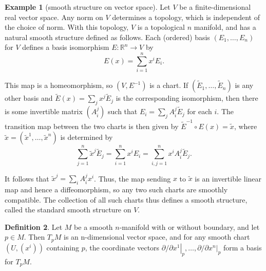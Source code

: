 \documentclass[12pt,a4paper]{book}
\theoremstyle{definition}
\newtheorem{defn}{Definition}[section]
\newtheorem{exam}[defn]{Example}
\begin{document}
\begin{exam}[smooth structure on vector space]
    Let $V$ be a finite-dimensional real vector
    space. Any norm on $V$ determines a topology,
    which is independent of the choice of norm. With this topology, $V$ is a topological $n$ manifold, and has a natural smooth structure defined as follows. Each (ordered) basis $\left(E_1, \ldots, E_n\right)$ for $V$ defines a basis isomorphism $E: \mathbb{R}^n \rightarrow V$ by
    $$
        E(x)=\sum_{i=1}^n x^i E_i .
    $$

    This map is a homeomorphism, so $\left(V, E^{-1}\right)$ is a chart. If $\left(\widetilde{E}_1, \ldots, \widetilde{E}_n\right)$ is any other basis and $\widetilde{E}(x)=\sum_j x^j \widetilde{E}_j$ is the corresponding isomorphism, then there is some invertible matrix $\left(A_i^j\right)$ such that $E_i=\sum_j A_i^j \widetilde{E}_j$ for each $i$. The transition map between the two charts is then given by $\widetilde{E}^{-1} \circ E(x)=\tilde{x}$, where $\tilde{x}=\left(\widetilde{x}^1, \ldots, \tilde{x}^n\right)$
    is determined by
    $$
        \sum_{j=1}^n \widetilde{x}^j \widetilde{E}_j=\sum_{i=1}^n x^i E_i=\sum_{i, j=1}^n x^i A_i^j \widetilde{E}_j .
    $$

    It follows that $\tilde{x}^j=\sum_i A_i^j x^i$. Thus, the map sending $x$ to $\tilde{x}$ is an invertible linear map and hence a diffeomorphism, so any two such charts are smoothly compatible. The collection of all such charts thus defines a smooth structure, called the standard smooth structure on $V$.
\end{exam}
\begin{defn}
    Let $M$ be a smooth $n$-manifold with or without boundary, and let $p \in M$. Then $T_p M$ is an n-dimensional vector space, and for any smooth chart $\left(U,\left(x^i\right)\right)$ containing $p$, the coordinate vectors $\partial /\left.\partial x^1\right|_p, \ldots, \partial /\left.\partial x^n\right|_p$ form a basis for $T_p M$.
\end{defn}
\end{document}

